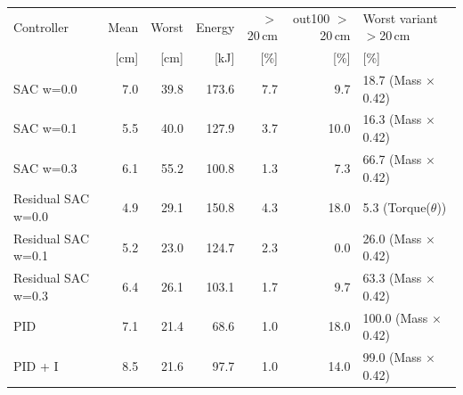 \begin{tabular}{lrrrrrl}
\hline
Controller & Mean & Worst & Energy & $>$20\,cm & out100 $>$20\,cm & Worst variant $>$20\,cm \\
 & [cm] & [cm] & [kJ] & [\%] & [\%] & [\%] \\
\hline
SAC w=0.0 & 7.0 & 39.8 & 173.6 & 7.7 & 9.7 & 18.7 (Mass $\times$0.42) \\
SAC w=0.1 & 5.5 & 40.0 & 127.9 & 3.7 & 10.0 & 16.3 (Mass $\times$0.42) \\
SAC w=0.3 & 6.1 & 55.2 & 100.8 & 1.3 & 7.3 & 66.7 (Mass $\times$0.42) \\
Residual SAC w=0.0 & 4.9 & 29.1 & 150.8 & 4.3 & 18.0 & 5.3 (Torque($\theta$)) \\
Residual SAC w=0.1 & 5.2 & 23.0 & 124.7 & 2.3 & 0.0 & 26.0 (Mass $\times$0.42) \\
Residual SAC w=0.3 & 6.4 & 26.1 & 103.1 & 1.7 & 9.7 & 63.3 (Mass $\times$0.42) \\
PID & 7.1 & 21.4 & 68.6 & 1.0 & 18.0 & 100.0 (Mass $\times$0.42) \\
PID + I & 8.5 & 21.6 & 97.7 & 1.0 & 14.0 & 99.0 (Mass $\times$0.42) \\
\hline
\end{tabular}
